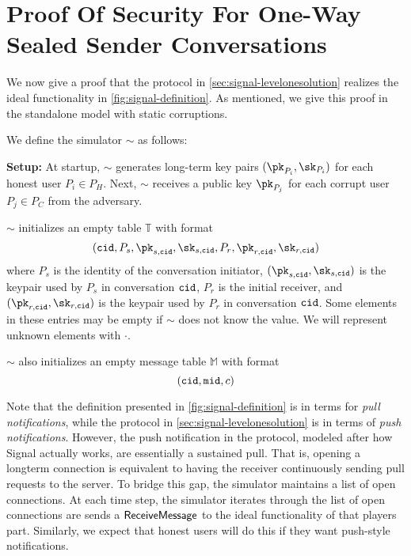 
\chapter{Proof Of Security For One-Way Sealed Sender Conversations} \label{sec:signal-proof} 

We now give a proof that the protocol in \cref{sec:signal-levelonesolution} realizes the ideal functionality in \cref{fig:signal-definition}.  As mentioned, we give this proof in the standalone model with static corruptions.

We define the simulator $\sim$ as follows:

\medskip \noindent
\textbf{Setup:} At startup, $\sim$ generates long-term key pairs $(\pk_{P_i}, \sk_{P_i})$  for each honest user $P_i \in P_H$.  Next, $\sim$ receives a public key $\pk_{P_j}$ for each corrupt user $P_j \in P_C$ from the adversary.  

$\sim$ initializes an empty table $\mathbb{T}$ with format $$(\convoid, P_s, \pk_{s,\convoid}, \sk_{s,\convoid}, P_r, \pk_{r,\convoid}, \sk_{r,\convoid})$$ where $P_s$ is the identity of the conversation initiator, $(\pk_{s,\convoid}, \sk_{s,\convoid})$ is the keypair used by $P_s$ in conversation $\mathtt{cid}$, $P_r$ is the initial receiver, and $(\pk_{r,\convoid}, \sk_{r,\convoid})$ is the keypair used by $P_r$ in conversation $\mathtt{cid}$.  Some elements in these entries may be empty if $\sim$ does not know the value.  We will represent unknown elements with $\cdot$.

$\sim$ also initializes an empty message table $\mathbb{M}$ with format $$(\mathtt{cid}, \mathtt{mid}, c)$$

Note that the definition presented in \cref{fig:signal-definition} is in terms for {\em pull notifications}, while the protocol in \cref{sec:signal-levelonesolution} is in terms of {\em push notifications}.  However, the push notification in the protocol, modeled after how Signal actually works, are essentially a sustained pull.  That is, opening a longterm connection is equivalent to having the receiver continuously sending pull requests to the server.  To bridge this gap, the simulator maintains a list of open connections.  At each time step, the simulator iterates through the list of open connections are sends a $\mathsf{ReceiveMessage}$ to the ideal functionality of that players part.  Similarly, we expect that honest users will do this if they want push-style notifications. 

